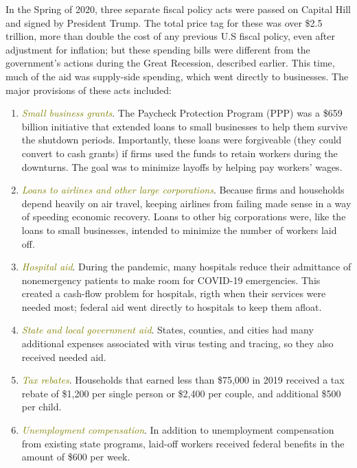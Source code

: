 \documentclass[11pt]{article} %
\begin{document}
In the Spring of 2020, three separate fiscal policy acts were passed on Capital Hill and signed by President Trump. The total price tag for these was over \$2.5 trillion, more than double the cost of any previous U.S fiscal policy, even after adjustment for inflation; but these spending bills were different from the government's actions during the Great Recession, described earlier. This time, much of the aid was supply-side spending, which went directly to businesses. The major provisions of these acts included:
\begin{enumerate}
\item \textit{\textcolor{olive}{Small business grants}}. The Paycheck Protection Program (PPP) was a \$659 billion initiative that extended loans to small businesses to help them survive the shutdown periods. Importantly, these loans were forgiveable (they could convert to cash grants) if firms used the funds to retain workers during the downturns. The goal was to minimize layoffs by helping pay workers' wages.
\item \textit{\textcolor{olive}{Loans to airlines and other large corporations}}. Because firms and households depend heavily on air travel, keeping airlines from failing made sense in a way of speeding economic recovery. Loans to other big corporations were, like the loans to small businesses, intended to minimize the number of workers laid off.
\item \textit{\textcolor{olive}{Hospital aid}}. During the pandemic, many hospitals reduce their admittance of nonemergency patients to make room for COVID-19 emergencies. This created a cash-flow problem for hospitals, rigth when their services were needed most; federal aid went directly to hospitals to keep them afloat.
\item \textit{\textcolor{olive}{State and local government aid}}. States, counties, and cities had many additional expenses associated with virus testing and tracing, so they also received needed aid.
\item \textit{\textcolor{olive}{Tax rebates}}. Households that earned less than \$75,000 in 2019 received a tax rebate of \$1,200 per single person or \$2,400 per couple, and additional \$500 per child.
\item \textit{\textcolor{olive}{Unemployment compensation}}. In addition to unemployment compensation from existing state programs, laid-off workers received federal benefits in the amount of \$600 per week.
\end{enumerate}
\end{document}
